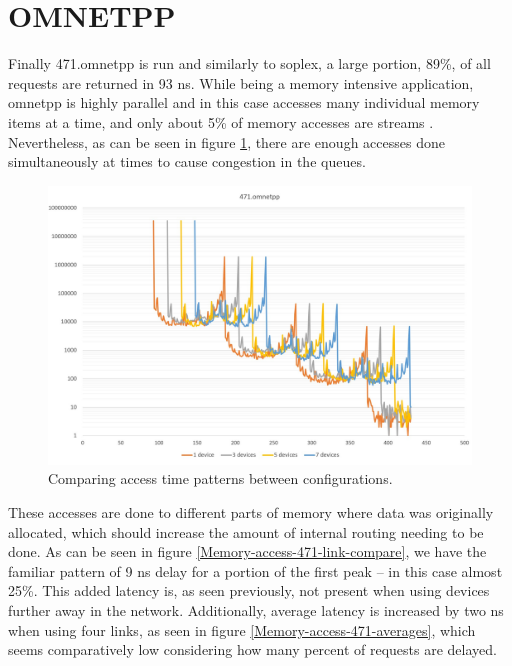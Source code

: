 \section{OMNETPP}
Finally 471.omnetpp is run and similarly to soplex, a large portion, 89\%, of all requests are returned in 93 ns. While being a memory intensive application, omnetpp is highly parallel and in this case accesses many individual memory items at a time, and only about 5\% of memory accesses are streams \cite{10.1145/3307650.3322229}. Nevertheless, as can be seen in figure \ref{Memory-access-471}, there are enough accesses done simultaneously at times to cause congestion in the queues.
\bigskip

\begin{figure}[!ht]
    \centering
    \includegraphics[width=1.0\linewidth]{figure/471-x_4.jpg}
    \caption{Comparing access time patterns between configurations.}
    \label{Memory-access-471}
\end{figure}

These accesses are done to different parts of memory where data was originally allocated, which should increase the amount of internal routing needing to be done. As can be seen in figure \ref{Memory-access-471-link-compare}, we have the familiar pattern of 9 ns delay for a portion of the first peak -- in this case almost 25\%. This added latency is, as seen previously, not present when using devices further away in the network. Additionally, average latency is increased by two ns when using four links, as seen in figure \ref{Memory-access-471-averages}, which seems comparatively low considering how many percent of requests are delayed.
\bigskip

